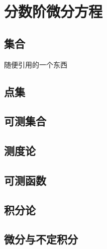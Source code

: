 \documentclass[12pt, a4paper, oneside, UTF8]{ctexbook}
\begin{document}
	\else
	\fi
	\chapter{分数阶微分方程}
	\section{集合}
	随便引用的一个东西\cite{choy20194d}
	
	\section{点集}
	
	\section{可测集合}
	
	\section{测度论}
	
	\section{可测函数}
	
	\section{积分论}
	
	\section{微分与不定积分}
	
	\ifx\allfiles\undefined
\end{document}
